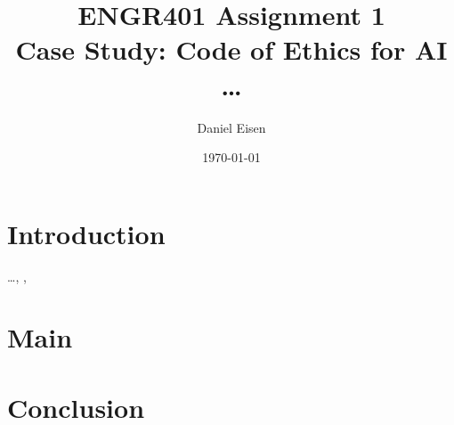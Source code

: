 \documentclass[11pt]{article}
\title{ENGR401 Assignment 1 \\ Case Study: Code of Ethics for AI \\ \dots}
\author{Daniel Eisen}
\date{\today}
\begin{document}
\maketitle
\section{Introduction}
\dots \cite{einstein}, \cite{knuthwebsite}, \cite{latexcompanion}

\section{Main}

\section{Conclusion}

\newpage


\end{document}
